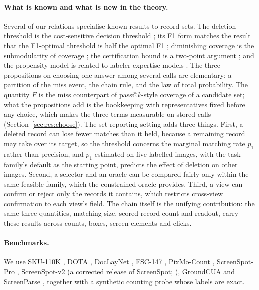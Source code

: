 \paragraph{What is known and what is new in the theory.} Several of our relations specialise known results to record sets. The deletion threshold is the cost-sensitive decision threshold \citep{elkan2001costsensitive}; its F1 form matches the result that the F1-optimal threshold is half the optimal F1 \citep{lipton2014f1}; diminishing coverage is the submodularity of coverage \citep{nemhauser1978submodular}; the certification bound is a two-point argument \citep{tsybakov2009nonparametric}; and the propensity model is related to labeler-expertise models \citep{whitehill2009glad}. The three propositions on choosing one answer among several calls are elementary: a partition of the miss event, the chain rule, and the law of total probability. The quantity $F$ is the miss counterpart of pass@$k$-style coverage of a candidate set; what the propositions add is the bookkeeping with representatives fixed before any choice, which makes the three terms measurable on stored calls (Section~\ref{sec:res:choose}). The set-reporting setting adds three things. First, a deleted record can lose fewer matches than it held, because a remaining record may take over its target, so the threshold concerns the marginal matching rate $p_1$ rather than precision, and $p_1$ estimated on five labelled images, with the task family's default as the starting point, predicts the effect of deletion on other images. Second, a selector and an oracle can be compared fairly only within the same feasible family, which the constrained oracle provides. Third, a view can confirm or reject only the records it contains, which restricts cross-view confirmation to each view's field. The chain itself is the unifying contribution: the same three quantities, matching size, scored record count and readout, carry these results across counts, boxes, screen elements and clicks.

\paragraph{Benchmarks.} We use SKU-110K \citep{goldman2019sku110k}, DOTA \citep{xia2018dota}, DocLayNet \citep{pfitzmann2022doclaynet}, FSC-147 \citep{ranjan2021fsc147}, PixMo-Count \citep{deitke2025molmo}, ScreenSpot-Pro \citep{li2025screenspotpro}, ScreenSpot-v2 (a corrected release of ScreenSpot; \citealp{cheng2024seeclick}), GroundCUA \citep{groundcua2026} and ScreenParse \citep{screenparse2026}, together with a synthetic counting probe whose labels are exact.
